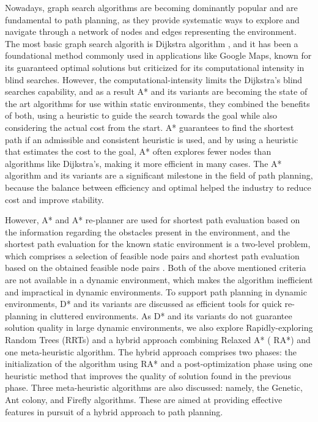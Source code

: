 Nowadays, graph search algorithms are becoming dominantly popular and are fundamental to path planning, as they provide systematic ways to explore and navigate through a network of nodes and edges representing the environment. The most basic graph search algorith is Dijkstra algorithm \parencite{dijkstra2022note}, and it has been a foundational method commonly used in applications like Google Maps, known for its guaranteed optimal solutions but criticized for its computational intensity in blind searches. However, the computational-intensity limits the Dijkstra’s blind searches capability, and as a result A* \parencite{hart1968formal} and its variants are becoming the state of the art algorithms for use within static environments, they combined the benefits of both, using a heuristic to guide the search towards the goal while also considering the actual cost from the start. A* guarantees to find the shortest path if an admissible and consistent heuristic is used, and by using a heuristic that estimates the cost to the goal, A* often explores fewer nodes than algorithms like Dijkstra's, making it more efficient in many cases. The A* algorithm and its variants are a significant milestone in the field of path planning, because the balance between efficiency and optimal helped the industry to reduce cost and improve stability.

However, A* and A* re-planner are used for shortest path evaluation based on the information regarding the obstacles present in the environment, and the shortest path evaluation for the known static environment is a two-level problem, which comprises a selection of feasible node pairs and shortest path evaluation based on the obtained feasible node pairs \parencite{dudi2020shortest}. Both of the above mentioned criteria are not available in a dynamic environment, which makes the algorithm inefficient and impractical in dynamic environments. To support path planning in dynamic environments, D* \parencite{stentz1994optimal} and its variants are discussed as efficient tools for quick re-planning in cluttered environments. As D* and its variants do not guarantee solution quality in large dynamic environments, we also explore Rapidly-exploring Random Trees (RRTs) \parencite{lavalle1998rapidly} and a hybrid approach combining Relaxed A* ( RA*) \parencite{ammar2016relaxed} and one meta-heuristic algorithm. The hybrid approach comprises two phases: the initialization of the algorithm using RA* and a post-optimization phase using one heuristic method that improves the quality of solution found in the previous phase. Three meta-heuristic algorithms are also discussed: namely, the Genetic, Ant colony, and Firefly algorithms. These are aimed at providing effective features in pursuit of a hybrid approach to path planning.

